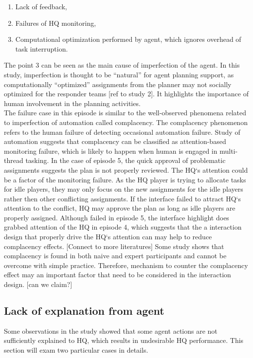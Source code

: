 \begin{enumerate}
\item Lack of feedback, \\
\item Failures of HQ monitoring, \\
\item Computational optimization performed by agent, which ignores overhead of task interruption. \\
\end{enumerate}

The point 3 can be seen as the main cause of imperfection of the agent. In this study, imperfection is thought to be ``natural'' for agent planning support, as computationally ``optimized'' assignments from the planner may not socially optimized for the responder teams [ref to study 2]. It highlights the importance of human involvement in the planning activities. \\

The failure case in this episode is similar to the well-observed phenomena related to imperfection of automation called complacency. The complacency phenomenon refers to the human failure of detecting occasional automation failure. Study of automation suggests that complacency can be classified as attention-based monitoring failure, which is likely to happen when human is engaged in multi-thread tasking. In the case of episode 5, the quick approval of problematic assignments suggests the plan is not properly reviewed. The HQ`s attention could be a factor of the monitoring failure. As the HQ player is trying to allocate tasks for idle players, they may only focus on the new assignments for the idle players rather then other conflicting assignments.  If the interface failed to attract HQ`s attention to the conflict, HQ may approve the plan as long as idle players are properly assigned. Although failed in episode 5, the interface highlight does grabbed attention of the HQ in episode 4, which suggests that the a interaction design that properly drive the HQ`s attention can may help to reduce complacency effects.  [Connect to more literatures] Some study shows that complacency is found in both naive and expert participants and cannot be overcome with simple practice. Therefore, mechanism to counter the complacency effect may an important factor that need to be considered in the interaction design. [can we claim?]

\subsection{Lack of explanation from agent }
Some observations in the study showed that some agent actions are not sufficiently explained to HQ, which results in undesirable HQ performance. This section will exam two particular cases in details.\\

